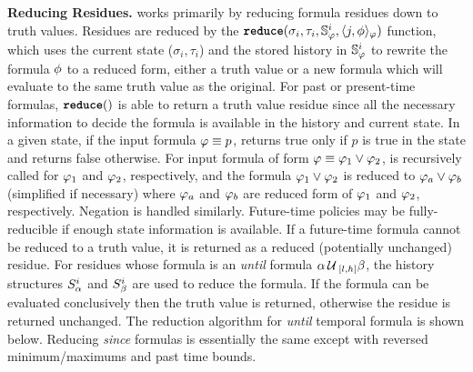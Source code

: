 \textbf{Reducing Residues.}
\monitor works primarily by reducing formula residues down to truth values.
Residues are reduced by the $\reduce(\sigma_i, \tau_i, \histSt{i}, \rpt{j}{\policyv}{\policy})$ function,
which uses the current state ($\sigma_i,\tau_i$) and the stored history in $\histSt{i}$ to rewrite
the formula $\policyv$ to a reduced form, either a truth value or a new formula which will evaluate
to the same truth value as the original.
For past or present-time formulas, $\reduce()$ is able to return a truth value residue
since all the necessary information to decide the formula is available in the history and current state.
In a given state, if the input formula $\policy\equiv p$, \reduce returns true
only if $p$ is true in the state and returns false otherwise. For input formula
of form $\policy\equiv\policy_1\vee\policy_2$, \reduce is recursively called for
$\policy_1$ and $\policy_2$, respectively, and the formula $\policy_1\vee\policy_2$ is reduced
to $\policy_a\vee\policy_b$ (simplified if necessary) where $\policy_a$ and
$\policy_b$ are reduced form of $\policy_1$ and $\policy_2$, respectively. Negation
is handled similarly. Future-time policies may be fully-reducible if enough state
information is available. If a future-time formula cannot be reduced to a truth
value, it is returned as a reduced (potentially unchanged) residue.
%
For residues whose formula is an \emph{until} formula $\alpha \until_{[l,h]} \beta$,
the history structures $\histst[\alpha]{i}$ and $\histst[\beta]{i}$ are used to
reduce the formula. If the formula can be evaluated conclusively then the truth
value is returned, otherwise the residue is returned unchanged.
The reduction algorithm for \emph{until} temporal formula is shown below.
Reducing \emph{since} formulas is essentially the same except with reversed
minimum/maximums and past time bounds.
%
